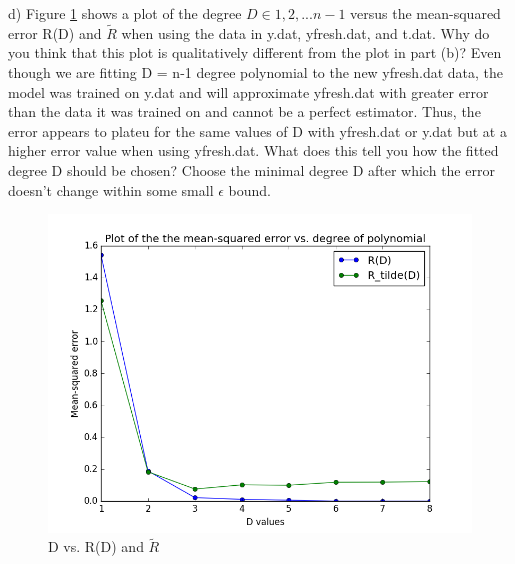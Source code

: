 \documentclass[11pt]{article}
\newenvironment{problem}[2][Problem]{\begin{trivlist}
\item[\hskip \labelsep {\bfseries #1}\hskip \labelsep {\bfseries #2.}]}{\end{trivlist}}
\begin{document}
\begin{problem}{2.1}
(d) Figure \ref{fig:2d} shows a plot of the degree $D \in {1,2,...n-1}$ versus the mean-squared error R(D) and $\tilde{R}$ when using the data in y.dat, yfresh.dat, and t.dat.  {\color{red}Why do you think that this plot is qualitatively different from the plot in part (b)?} Even though we are fitting D = n-1 degree polynomial to the new yfresh.dat data, the model was trained on y.dat and will approximate yfresh.dat with greater error than the data it was trained on and cannot be a perfect estimator. Thus, the error appears to plateu for the same values of D with yfresh.dat or y.dat but at a higher error value when using yfresh.dat. {\color{red}What does this tell you how the fitted degree D should be chosen?} Choose the minimal degree D after which the error doesn't change within some small $\epsilon$ bound. 
\begin{figure}[h!]
  \centering
  \includegraphics[scale=0.5]{figs/2d.png}
  \caption{D vs. R(D) and $\tilde{R}$}
  \label{fig:2d}
\end{figure}


\end{problem}
\end{document}

